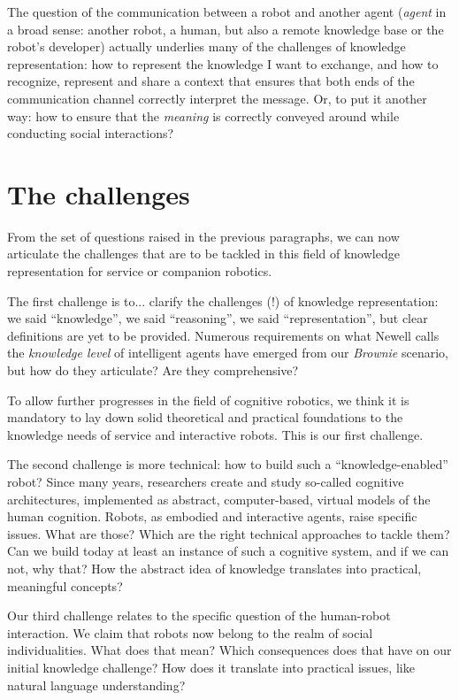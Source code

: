 The question of the communication between a robot and another agent
(\emph{agent} in a broad sense: another robot, a human, but also a remote
knowledge base or the robot's developer) actually underlies many of the
challenges of knowledge representation: how to represent the knowledge I want
to exchange, and how to recognize, represent and share a context that ensures
that both ends of the communication channel correctly interpret the message.
Or, to put it another way: how to ensure that the \emph{meaning} is correctly
conveyed around while conducting social interactions?


\section{The challenges}
\label{sect|challenges}

From the set of questions raised in the previous paragraphs, we can now
articulate the challenges that are to be tackled in this field of knowledge
representation for service or companion robotics.

The first challenge is to... clarify the challenges (!) of knowledge
representation: we said ``knowledge'', we said ``reasoning'', we said
``representation'', but clear definitions are yet to be provided. Numerous
requirements on what Newell calls the \emph{knowledge level} of intelligent
agents have emerged from our \emph{Brownie} scenario, but how do they
articulate? Are they comprehensive?

To allow further progresses in the field of cognitive robotics, we think
it is mandatory to lay down solid theoretical and practical foundations to the
knowledge needs of service and interactive robots. This is our first challenge.

The second challenge is more technical: how to build such a
``knowledge-enabled'' robot? Since many years, researchers create and study
so-called cognitive architectures, implemented as abstract, computer-based,
virtual models of the human cognition. Robots, as embodied and interactive
agents, raise specific issues. What are those? Which are the right technical
approaches to tackle them? Can we build today at least an instance of such a
cognitive system, and if we can not, why that? How the abstract idea of
knowledge translates into practical, meaningful concepts?

Our third challenge relates to the specific question of the human-robot
interaction. We claim that robots now belong to the realm of social
individualities. What does that mean? Which consequences does that have on our
initial knowledge challenge? How does it translate into practical issues, like
natural language understanding?

